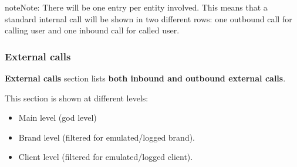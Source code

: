 \documentclass[letterpaper,10pt,english]{sphinxmanual}
\begin{document}
\begin{notice}{note}{Note:}
There will be one entry per entity involved. This means that a standard internal call will be shown
in two different rows: one outbound call for calling user and one inbound call for called user.
\end{notice}


\subsubsection{External calls}
\label{administration_portal/client/residential/calls/external_calls:id1}\label{administration_portal/client/residential/calls/external_calls::doc}\label{administration_portal/client/residential/calls/external_calls:external-calls}
\textbf{External calls} section lists \textbf{both inbound and outbound external calls}.

This section is shown at different levels:
\begin{itemize}
\item {} 
Main level (god level)

\item {} 
Brand level (filtered for emulated/logged brand).

\item {} 
Client level (filtered for emulated/logged client).

\end{itemize}
\end{document}
